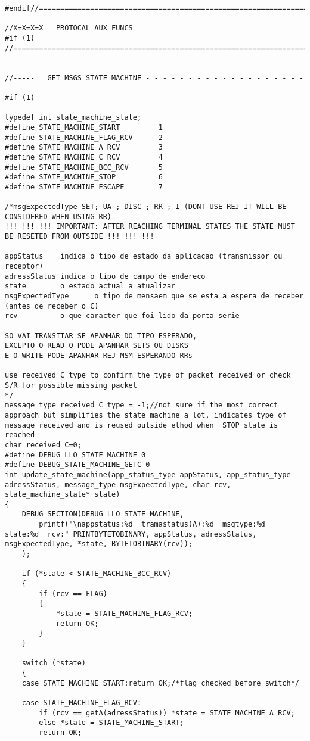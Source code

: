\begin{lstlisting}
#endif//==========================================================================

//X=X=X=X   PROTOCAL AUX FUNCS
#if (1)
//================================================================================


//-----   GET MSGS STATE MACHINE - - - - - - - - - - - - - - - - - - - - - - - - - - - - - -
#if (1)

typedef int state_machine_state;
#define STATE_MACHINE_START			1
#define STATE_MACHINE_FLAG_RCV		2
#define STATE_MACHINE_A_RCV			3
#define STATE_MACHINE_C_RCV			4
#define STATE_MACHINE_BCC_RCV		5
#define STATE_MACHINE_STOP			6
#define STATE_MACHINE_ESCAPE		7

/*msgExpectedType SET; UA ; DISC ; RR ; I (DONT USE REJ IT WILL BE CONSIDERED WHEN USING RR)
!!! !!! !!! IMPORTANT: AFTER REACHING TERMINAL STATES THE STATE MUST BE RESETED FROM OUTSIDE !!! !!! !!!

appStatus	 indica o tipo de estado da aplicacao (transmissor ou receptor)
adressStatus indica o tipo de campo de endereco
state		 o estado actual a atualizar
msgExpectedType		 o tipo de mensaem que se esta a espera de receber (antes de receber o C)
rcv			 o que caracter que foi lido da porta serie

SO VAI TRANSITAR SE APANHAR DO TIPO ESPERADO,
EXCEPTO O READ Q PODE APANHAR SETS OU DISKS
E O WRITE PODE APANHAR REJ MSM ESPERANDO RRs

use received_C_type to confirm the type of packet received or check S/R for possible missing packet
*/
message_type received_C_type = -1;//not sure if the most correct approach but simplifies the state machine a lot, indicates type of message received and is reused outside ethod when _STOP state is reached
char received_C=0;
#define DEBUG_LLO_STATE_MACHINE 0
#define DEBUG_STATE_MACHINE_GETC 0
int update_state_machine(app_status_type appStatus, app_status_type adressStatus, message_type msgExpectedType, char rcv, state_machine_state* state)
{
	DEBUG_SECTION(DEBUG_LLO_STATE_MACHINE,
		printf("\nappstatus:%d  tramastatus(A):%d  msgtype:%d   state:%d  rcv:" PRINTBYTETOBINARY, appStatus, adressStatus, msgExpectedType, *state, BYTETOBINARY(rcv));
	);

	if (*state < STATE_MACHINE_BCC_RCV)
	{
		if (rcv == FLAG)
		{
			*state = STATE_MACHINE_FLAG_RCV;
			return OK;
		}
	}

	switch (*state)
	{
	case STATE_MACHINE_START:return OK;/*flag checked before switch*/

	case STATE_MACHINE_FLAG_RCV:
		if (rcv == getA(adressStatus)) *state = STATE_MACHINE_A_RCV;
		else *state = STATE_MACHINE_START;
		return OK;


\end{lstlisting}
